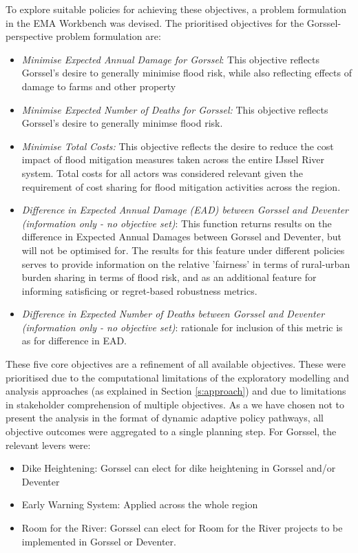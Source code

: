 To explore suitable policies for achieving these objectives, a problem formulation in the EMA Workbench was devised.
The prioritised objectives for the Gorssel-perspective problem formulation are:
\begin{itemize}
    \item \textit{Minimise Expected Annual Damage for Gorssel}: This objective reflects Gorssel's desire to generally minimise flood risk, while also reflecting effects of damage to farms and other property
    \item \textit{Minimise Expected Number of Deaths for Gorssel:} This objective reflects Gorssel's desire to generally minimse flood risk.
    \item \textit{Minimise Total Costs:} This objective reflects the desire to reduce the cost impact of flood mitigation measures taken across the entire IJssel River system. Total costs for all actors was considered relevant given the requirement of cost sharing for flood mitigation activities across the region.
    \item \textit{Difference in Expected Annual Damage (EAD) between Gorssel and Deventer (information only - no objective set)}: This function returns results on the difference in Expected Annual Damages between Gorssel and Deventer, but will not be optimised for. The results for this feature under different policies serves to provide information on the relative 'fairness' in terms of rural-urban burden sharing in terms of flood risk, and as an additional feature for informing satisficing or regret-based robustness metrics.
    \item \textit{Difference in Expected Number of Deaths between Gorssel and Deventer (information only - no objective set)}: rationale for inclusion of this metric is as for difference in EAD.
\end{itemize}
These five core objectives are a refinement of all available objectives. These were prioritised due to the computational limitations of the exploratory modelling and analysis approaches (as explained in Section \ref{s:approach}) and due to limitations in stakeholder comprehension of multiple objectives. As a we have chosen not to present the analysis in the format of dynamic adaptive policy pathways, all objective outcomes were aggregated to a single planning step. 
For Gorssel, the relevant levers were:
\begin{itemize}
    \item Dike Heightening: Gorssel can elect for dike heightening in Gorssel and/or Deventer
    \item Early Warning System: Applied across the whole region
    \item Room for the River: Gorssel can elect for Room for the River projects to be implemented in Gorssel or Deventer.
\end{itemize}

